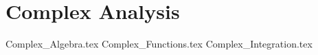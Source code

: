 \section{Complex Analysis}

{Complex_Algebra.tex}
{Complex_Functions.tex}
{Complex_Integration.tex}
